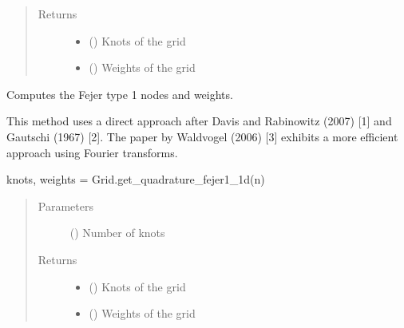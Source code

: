 \documentclass[letterpaper,10pt,english,openany,oneside]{sphinxmanual}
\begin{document}
\begin{fulllineitems}
\begin{fulllineitems}
\begin{quote}
\begin{description}
\item[{Returns}] \leavevmode
\begin{itemize}
\item {} 
 () \textendash{} Knots of the grid

\item {} 
 () \textendash{} Weights of the grid

\end{itemize}


\end{description}\end{quote}

\end{fulllineitems}


\begin{fulllineitems}
\label{\detokenize{pygpc:pygpc.Grid.Grid.get_quadrature_fejer1_1d}}
Computes the Fejer type 1 nodes and weights.

This method uses a direct approach after Davis and Rabinowitz (2007) {[}1{]} and Gautschi (1967) {[}2{]}.
The paper by Waldvogel (2006) {[}3{]} exhibits a more efficient approach using Fourier transforms.

knots, weights = Grid.get\_quadrature\_fejer1\_1d(n)
\begin{quote}\begin{description}
\item[{Parameters}] \leavevmode
{} () \textendash{} Number of knots

\item[{Returns}] \leavevmode
\begin{itemize}
\item {} 
 () \textendash{} Knots of the grid

\item {} 
 () \textendash{} Weights of the grid

\end{itemize}


\end{description}\end{quote}

\end{fulllineitems}
\end{fulllineitems}
\end{document}
